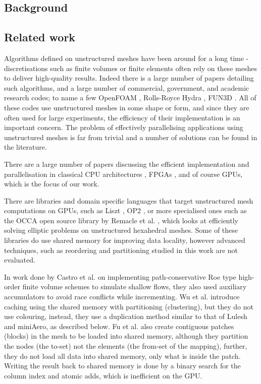 \subsection{Background}\label{sec:background}


\subsection{Related work}\label{related-works}

Algorithms defined on unstructured meshes have been around for a long time -
discretisations such as finite volumes or finite elements often rely on these
meshes to deliver high-quality results. Indeed there is a large number of papers
detailing such algorithms, and a large number of commercial, government, and
academic research codes; to name a few OpenFOAM \cite{OpenFoamUserGuide},
Rolls-Royce Hydra \cite{moinier2002edge}, FUN3D \cite{biedron2017fun3d}. All of
these codes use unstructured meshes in some shape or form, and since they are
often used for large experiments, the efficiency of their implementation is  an
important concern. The problem of effectively parallelising applications using
unstructured meshes is far from trivial and a number of solutions can be found
in the literature.

There are a large number of papers discussing the efficient implementation and
parallelisation in classical CPU architectures
\cite{mavriplis2002parallel,jin1999openmp}, FPGAs
\cite{nagy2014accelerating,akamine2012reconfigurable}, and of course GPUs,
which is the focus of our work.

There are libraries and domain specific languages that target unstructured mesh
computations on GPUs, such as Liszt \cite{devito2011liszt}, OP2
\cite{giles2012op2}, or more specialised ones such as the OCCA\cite{libocca}
open source library by Remacle et al. \cite{remacle2016gpu}, which looks at
efficiently solving elliptic problems on unstructured hexahedral meshes. Some
of these libraries do use shared memory for improving data locality, however
advanced techniques, such as reordering and partitioning studied in this work
are not evaluated. 

In work done by Castro et al. \cite{shallow_water} on implementing
path-conservative Roe type high-order finite volume schemes to simulate shallow
flows, they also used auxiliary accumulators to avoid race conflicts while
incrementing. Wu et al. \cite{wu2013complexity} introduce caching using the
shared memory with partitioning (clustering), but they do not use colouring,
instead, they use a duplication method similar to that of Lulesh and miniAero,
as described below. Fu et al. \cite{fu2014architecting} also create contiguous
patches (blocks) in the mesh to be loaded into shared memory, although they
partition the nodes (the to-set) not the elements (the from-set of the
mapping), further, they do not load all data into shared memory, only what is
inside the patch. Writing the result back to shared memory is done by a binary
search for the column index and atomic adds, which is inefficient on the GPU. 

